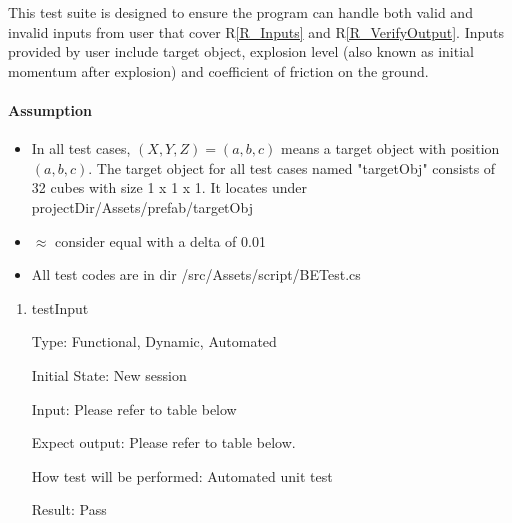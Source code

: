 \documentclass[12pt, titlepage]{article}
\newcommand{\rref}[1]{R\ref{#1}}
\begin{document}
This test suite is designed to ensure the program can handle both valid and invalid inputs from user that cover \rref{R_Inputs} and \rref{R_VerifyOutput}. Inputs provided by user include target object, explosion level (also known as initial momentum after explosion) and coefficient of friction on the ground.
\paragraph{Assumption}
\begin{itemize}
	\item In all test cases, $(X,Y,Z) = (a,b,c)$ means a target object with position $(a,b,c)$. The target object for all test cases named "targetObj" consists of 32 cubes with size 1 x 1 x 1. It locates under projectDir/Assets/prefab/targetObj 
	
	\item $\approx$ consider equal with a delta of 0.01
	
	\item All test codes are in dir /src/Assets/script/BETest.cs
\end{itemize}

\begin{enumerate}
	
	\item{testInput}
	
	Type: Functional, Dynamic, Automated
	
	Initial State: New session
	
	Input: Please refer to table below
	
	Expect output: Please refer to table below.
	
	How test will be performed: Automated unit test
	
	Result: Pass
\end{enumerate}
\end{document}
